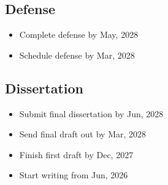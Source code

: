 \documentclass[12pt,letter]{article}
\begin{document}
\subsection{Defense}	
\begin{itemize}
	\item Complete defense by May, 2028
	\item Schedule defense by Mar, 2028
	\end{itemize}
\subsection{Dissertation}	
\begin{itemize}
	\item Submit final dissertation by Jun, 2028
	\item Send final draft out by Mar, 2028
	\item Finish first draft by Dec, 2027
	\item Start writing from Jun, 2026
	\end{itemize}
\end{document}
